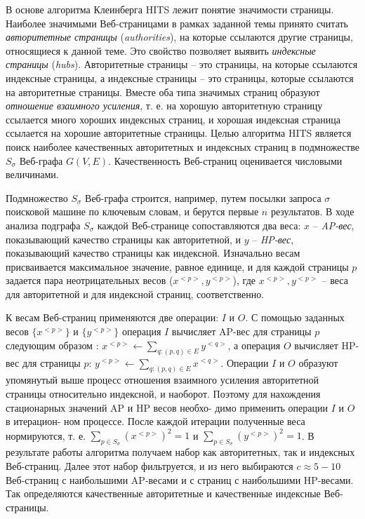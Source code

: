 В основе алгоритма Клеинберга HITS лежит понятие значимости страницы. Наиболее значимыми Веб-страницами в рамках заданной темы принято считать \textit{авторитетные страницы} (\textit{authorities}), на которые ссылаются другие страницы, относящиеся к данной теме. Это свойство позволяет выявить \textit{индексные страницы} (\textit{hubs}). Авторитетные страницы -- это страницы, на которые ссылаются индексные страницы, а индексные страницы -- это страницы, которые ссылаются на авторитетные страницы. Вместе оба типа значимых страниц образуют \textit{отношение взаимного усиления}, т. е. на хорошую авторитетную страницу ссылается много хороших индексных страниц, и хорошая индексная страница ссылается на хорошие авторитетные страницы. Целью алгоритма HITS является поиск наиболее качественных авторитетных и индексных страниц в подмножестве \(S_\sigma\) Веб-графа \(G(V, E)\). Качественность Веб-страниц оценивается числовыми величинами.

Подмножество \(S_\sigma\) Веб-графа строится, например, путем посылки запроса \(\sigma\) поисковой машине по ключевым словам, и берутся первые \(n\) результатов. В ходе анализа подграфа \(S_\sigma\) каждой Веб-странице сопоставляются два веса: \(x\) -- \textit{AP-вес}, показывающий качество страницы как авторитетной, и \(y\) – \textit{HP-вес}, показывающий качество страницы как индексной. Изначально весам присваивается максимальное значение, равное единице, и для каждой страницы \(p\) задается пара неотрицательных весов (\(x^{<p>}, y^{<p>}\)), где \(x^{<p>}, y^{<p>}\) -- веса для авторитетной и для индексной страниц, соответственно.

К весам Веб-страниц применяются две операции: \(I\) и \(O\). С помощью заданных весов \(\{x^{<p>}\}\) и \(\{y^{<p>}\}\) операция \(I\) вычисляет AP-вес для страницы \(p\) следующим образом \cite{Kleinberg}: \(x^{<p>} \leftarrow \sum_{q: (p, q) \in E} y^{<q>}\), а операция \(O\) вычисляет HP-вес для страницы \(p\): \(y^{<p>} \leftarrow \sum_{q: (p, q) \in E} x^{<q>}\). Операции \(I\) и \(O\) образуют упомянутый выше процесс отношения взаимного усиления авторитетной страницы относительно индексной, и наоборот. Поэтому для нахождения стационарных значений AP и HP весов необхо- димо применить операции \(I\) и \(O\) в итерацион- ном процессе. После каждой итерации полученные веса нормируются, т. е. \(\sum_{p \in S_\sigma} (x^{<p>})^2 = 1\) и  \(\sum_{p \in S_\sigma} (y^{<p>})^2 = 1\). В результате работы алгоритма получаем набор как авторитетных, так и индексных Веб-страниц. Далее этот набор фильтруется, и из него выбираются \(c \approx 5-10\) Веб-страниц с наибольшими AP-весами и с страниц с наибольшими HP-весами. Так определяются качественные авторитетные и качественные индексные Веб-страницы.

